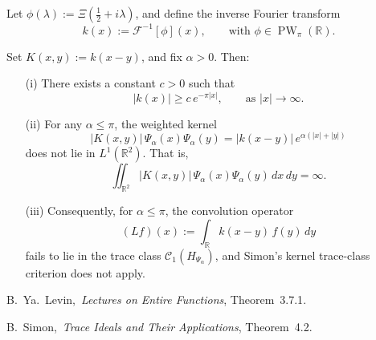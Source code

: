 \begin{lemma}
\label{lem:trace_class_failure_alpha_leq_pi}
Let \( \phi(\lambda) := \Xi\left( \tfrac{1}{2} + i\lambda \right) \), and define the inverse Fourier transform
\[
k(x) := \mathcal{F}^{-1}[\phi](x), \qquad \text{with } \phi \in \operatorname{PW}_\pi(\mathbb{R}).
\]

Set \( K(x,y) := k(x - y) \), and fix \( \alpha > 0 \). Then:
\begin{itemize}
    \item[\textup{(i)}] There exists a constant \( c > 0 \) such that
    \[
    |k(x)| \ge c\, e^{-\pi |x|}, \qquad \text{as } |x| \to \infty.
    \]

    \item[\textup{(ii)}] For any \( \alpha \le \pi \), the weighted kernel
    \[
    |K(x,y)|\, \Psi_\alpha(x)\Psi_\alpha(y) = |k(x - y)|\, e^{\alpha(|x| + |y|)}
    \]
    does not lie in \( L^1(\mathbb{R}^2) \). That is,
    \[
    \iint_{\mathbb{R}^2} |K(x,y)|\, \Psi_\alpha(x)\Psi_\alpha(y)\, dx\,dy = \infty.
    \]

    \item[\textup{(iii)}] Consequently, for \( \alpha \le \pi \), the convolution operator
    \[
    (L f)(x) := \int_{\mathbb{R}} k(x - y)\, f(y)\, dy
    \]
    fails to lie in the trace class \( \mathcal{C}_1(H_{\Psi_\alpha}) \), and Simon’s kernel trace-class criterion does not apply.
\end{itemize}
\begin{references}
  \item B.~Ya.~Levin,\ \emph{Lectures on Entire Functions}, Theorem~3.7.1\cite{Levin1996EntireLectures}.
  \item B.~Simon,\ \emph{Trace Ideals and Their Applications}, Theorem~4.2\cite{Simon2005TraceIdeals}.
\end{references}
\end{lemma}
